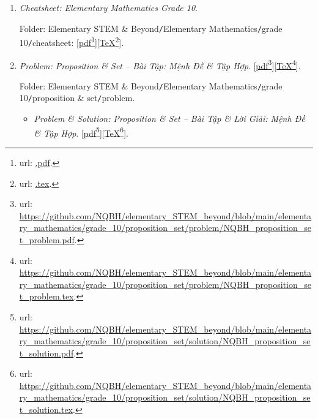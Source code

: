 \documentclass[12pt,oneside]{book}
\begin{document}
\begin{enumerate}
	\item {\it Cheatsheet: Elementary Mathematics Grade 10}.
	
	Folder: {\sf Elementary STEM \& Beyond{\tt/}Elementary Mathematics{\tt/}grade 10{\tt/}cheatsheet}: [\href{.pdf}{pdf}\footnote{{\sc url}: \url{.pdf}.}][\href{.tex}{\TeX}\footnote{{\sc url}: \url{.tex}.}].
	\item {\it Problem: Proposition \& Set -- Bài Tập: Mệnh Đề \& Tập Hợp}. [\href{https://github.com/NQBH/elementary_STEM_beyond/blob/main/elementary_mathematics/grade_10/proposition_set/problem/NQBH_proposition_set_problem.pdf}{pdf}\footnote{{\sc url}: \url{https://github.com/NQBH/elementary_STEM_beyond/blob/main/elementary_mathematics/grade_10/proposition_set/problem/NQBH_proposition_set_problem.pdf}.}][\href{https://github.com/NQBH/elementary_STEM_beyond/blob/main/elementary_mathematics/grade_10/proposition_set/problem/NQBH_proposition_set_problem.tex}{\TeX}\footnote{{\sc url}: \url{https://github.com/NQBH/elementary_STEM_beyond/blob/main/elementary_mathematics/grade_10/proposition_set/problem/NQBH_proposition_set_problem.tex}.}].
	
	Folder: {\sf Elementary STEM \& Beyond{\tt/}Elementary Mathematics{\tt/}grade 10{\tt/}proposition \& set{\tt/}problem}.
	\begin{itemize}
		\item {\it Problem \& Solution: Proposition \& Set -- Bài Tập \& Lời Giải: Mệnh Đề \& Tập Hợp}. [\href{https://github.com/NQBH/elementary_STEM_beyond/blob/main/elementary_mathematics/grade_10/proposition_set/solution/NQBH_proposition_set_solution.pdf}{pdf}\footnote{{\sc url}: \url{https://github.com/NQBH/elementary_STEM_beyond/blob/main/elementary_mathematics/grade_10/proposition_set/solution/NQBH_proposition_set_solution.pdf}.}][\href{https://github.com/NQBH/elementary_STEM_beyond/blob/main/elementary_mathematics/grade_10/proposition_set/solution/NQBH_proposition_set_solution.tex}{\TeX}\footnote{{\sc url}: \url{https://github.com/NQBH/elementary_STEM_beyond/blob/main/elementary_mathematics/grade_10/proposition_set/solution/NQBH_proposition_set_solution.tex}.}].
		

\end{itemize}
\end{enumerate}
\end{document}
